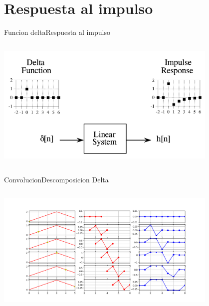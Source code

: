 \section{Respuesta al impulso}
\begin{frame}{Funcion delta}{Respuesta al impulso}
   \begin{columns}[c]
      \begin{column}{1\textwidth}
         \centering\includegraphics[width=0.8\textwidth]{4_clase/respuesta_impulso}
      \end{column}
   \end{columns}
   \vfill
\end{frame}
\begin{frame}{Convolucion}{Descomposicion Delta}
   \begin{columns}[c]
      \begin{column}{1\textwidth}
         \centering\includegraphics[width=0.8\textwidth]{4_clase/descomposicion_delta}
      \end{column}
   \end{columns}
   \vfill
\end{frame}
